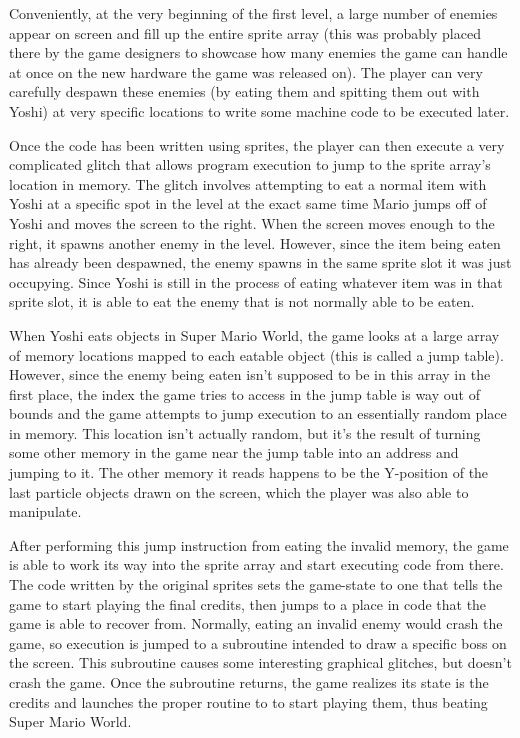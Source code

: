 Conveniently, at the very beginning of the first level, a large number of enemies appear on screen and fill up the entire sprite array (this was probably placed there by the game designers to showcase how many enemies the game can handle at once on the new hardware the game was released on). The player can very carefully despawn these enemies (by eating them and spitting them out with Yoshi) at very specific locations to write some machine code to be executed later.


Once the code has been written using sprites, the player can then execute a very complicated glitch that allows program execution to jump to the sprite array’s location in memory. The glitch involves attempting to eat a normal item with Yoshi at a specific spot in the level at the exact same time Mario jumps off of Yoshi and moves the screen to the right. When the screen moves enough to the right, it spawns another enemy in the level. However, since the item being eaten has already been despawned, the enemy spawns in the same sprite slot it was just occupying. Since Yoshi is still in the process of eating whatever item was in that sprite slot, it is able to eat the enemy that is not normally able to be eaten.


When Yoshi eats objects in Super Mario World, the game looks at a large array of memory locations mapped to each eatable object (this is called a jump table). However, since the enemy being eaten isn’t supposed to be in this array in the first place, the index the game tries to access in the jump table is way out of bounds and the game attempts to jump execution to an essentially random place in memory. This location isn’t actually random, but it’s the result of turning some other memory in the game near the jump table into an address and jumping to it. The other memory it reads happens to be the Y-position of the last particle objects drawn on the screen, which the player was also able to manipulate.


After performing this jump instruction from eating the invalid memory, the game is able to work its way into the sprite array and start executing code from there. The code written by the original sprites sets the game-state to one that tells the game to start playing the final credits, then jumps to a place in code that the game is able to recover from. Normally, eating an invalid enemy would crash the game, so execution is jumped to a subroutine intended to draw a specific boss on the screen. This subroutine causes some interesting graphical glitches, but doesn’t crash the game. Once the subroutine returns, the game realizes its state is the credits and launches the proper routine to to start playing them, thus beating Super Mario World.

